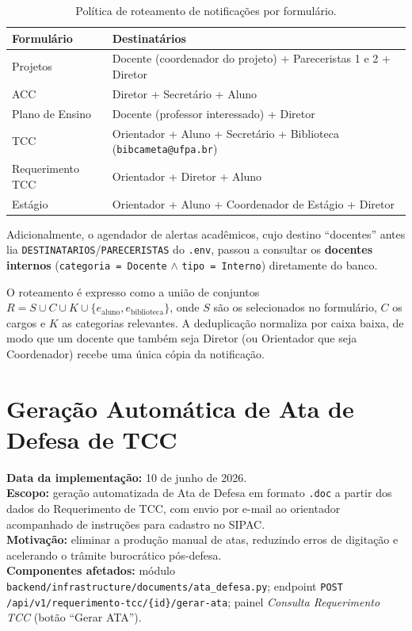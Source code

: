\documentclass[12pt,a4paper]{report}
\begin{document}
\begin{table}[H]
\centering
\small
\begin{tabularx}{\textwidth}{l X}
\toprule
\textbf{Formulário} & \textbf{Destinatários} \\
\midrule
Projetos          & Docente (coordenador do projeto) + Pareceristas 1 e 2 + Diretor \\
ACC               & Diretor + Secretário + Aluno \\
Plano de Ensino   & Docente (professor interessado) + Diretor \\
TCC               & Orientador + Aluno + Secretário + Biblioteca (\texttt{bibcameta@ufpa.br}) \\
Requerimento TCC  & Orientador + Diretor + Aluno \\
Estágio           & Orientador + Aluno + Coordenador de Estágio + Diretor \\
\bottomrule
\end{tabularx}
\caption{Política de roteamento de notificações por formulário.}
\label{tab:roteamento}
\end{table}

Adicionalmente, o agendador de alertas acadêmicos, cujo destino
``docentes'' antes lia \texttt{DESTINATARIOS}/\texttt{PARECERISTAS} do
\texttt{.env}, passou a consultar os \textbf{docentes internos}
(\texttt{categoria = Docente} $\wedge$ \texttt{tipo = Interno}) diretamente do
banco.

\begin{insight}[title=Composição e deduplicação de destinatários]
O roteamento é expresso como a união de conjuntos
$R = S \cup C \cup K \cup \{e_{\text{aluno}}, e_{\text{biblioteca}}\}$, onde $S$
são os selecionados no formulário, $C$ os cargos e $K$ as categorias relevantes.
A deduplicação normaliza por caixa baixa, de modo que um docente que também seja
Diretor (ou Orientador que seja Coordenador) recebe uma única cópia da
notificação.
\end{insight}

\chapter{Geração Automática de Ata de Defesa de TCC}

\begin{controle}
\textbf{Data da implementação:} 10 de junho de 2026.\\
\textbf{Escopo:} geração automatizada de Ata de Defesa em formato \texttt{.doc}
a partir dos dados do Requerimento de TCC, com envio por e-mail ao orientador
acompanhado de instruções para cadastro no SIPAC.\\
\textbf{Motivação:} eliminar a produção manual de atas, reduzindo erros de
digitação e acelerando o trâmite burocrático pós-defesa.\\
\textbf{Componentes afetados:} módulo
\texttt{backend/infrastructure/documents/ata\_defesa.py}; endpoint \texttt{POST
/api/v1/requerimento-tcc/\{id\}/gerar-ata}; painel \emph{Consulta Requerimento
TCC} (botão ``Gerar ATA'').
\end{controle}
\end{document}
